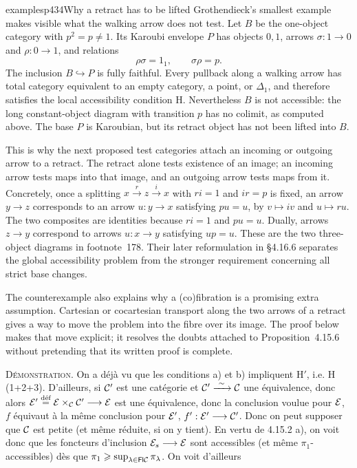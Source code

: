 \begin{dcomment}{examples}{p434}{Why a retract has to be lifted}
Grothendieck's smallest example makes visible what the walking arrow does not test. Let $B$ be the one-object category with $p^2=p\ne1$. Its Karoubi envelope $P$ has objects $0,1$, arrows $\sigma:1\to0$ and $\rho:0\to1$, and relations
\[
 \rho\sigma=1_1,\qquad\sigma\rho=p.
\]
The inclusion $B\hookrightarrow P$ is fully faithful. Every pullback along a walking arrow has total category equivalent to an empty category, a point, or $\Delta_1$, and therefore satisfies the local accessibility condition H. Nevertheless $B$ is not accessible: the long constant-object diagram with transition $p$ has no colimit, as computed above. The base $P$ is Karoubian, but its retract object has not been lifted into $B$.

This is why the next proposed test categories attach an incoming or outgoing arrow to a retract. The retract alone tests existence of an image; an incoming arrow tests maps into that image, and an outgoing arrow tests maps from it. Concretely, once a splitting $x\xrightarrow{r}z\xrightarrow{i}x$ with $ri=1$ and $ir=p$ is fixed, an arrow $y\to z$ corresponds to an arrow $u:y\to x$ satisfying $pu=u$, by $v\mapsto iv$ and $u\mapsto ru$. The two composites are identities because $ri=1$ and $pu=u$. Dually, arrows $z\to y$ correspond to arrows $u:x\to y$ satisfying $up=u$. These are the two three-object diagrams in footnote~178. Their later reformulation in \S4.16.6 separates the global accessibility problem from the stronger requirement concerning all strict base changes.

The counterexample also explains why a (co)fibration is a promising extra assumption. Cartesian or cocartesian transport along the two arrows of a retract gives a way to move the problem into the fibre over its image. The proof below makes that move explicit; it resolves the doubts attached to Proposition~4.15.6 without pretending that its written proof is complete.
\end{dcomment}


\textsc{Démonstration}. On a déjà vu que les conditions a) et b) impliquent $\mathrm{H}'$, i.e. H (1+2+3). D'ailleurs, si $\mathcal{C}'$ est une catégorie et $\cC' \xrightarrow{\ \sim\ } \cC$ une équivalence, donc alors $\mathcal{E}' \overset{\text{déf}}{=} \mathcal{E} \times_{\mathcal{C}} \mathcal{C}' \longrightarrow \mathcal{E}$ est une équivalence, donc la conclusion voulue pour $\mathcal{E}$, $f$ équivaut à la même conclusion pour $\mathcal{E}'$, $f' : \mathcal{E}' \longrightarrow \mathcal{C}'$. Donc on peut supposer que $\mathcal{C}$ est petite (et même réduite, si on y tient). En vertu de 4.15.2 a), on voit donc que les foncteurs d'inclusion $\mathcal{E}_s \longrightarrow \mathcal{E}$ sont accessibles (et même $\pi_1$-accessibles) dès que $\pi_1 \geqslant \sup_{\lambda \in \mathsf{Fl} \mathcal{C}} \pi_{\lambda}$. On voit d'ailleurs

